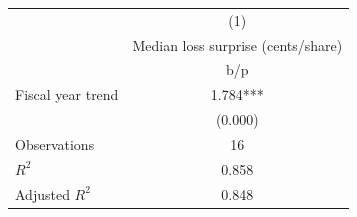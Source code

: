 {
\def\sym#1{\ifmmode^{#1}\else\(^{#1}\)\fi}
\begin{tabular}{l*{1}{c}}
\hline\hline
                    &\multicolumn{1}{c}{(1)}\\
                    &\multicolumn{1}{c}{Median loss surprise (cents/share)}\\
                    &         b/p   \\
\hline
Fiscal year trend   &       1.784***\\
                    &     (0.000)   \\
\hline
Observations        &          16   \\
\(R^{2}\)           &       0.858   \\
Adjusted \(R^{2}\)  &       0.848   \\
\hline\hline
\end{tabular}
}
